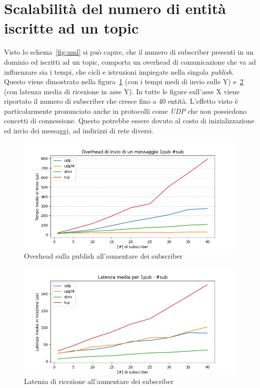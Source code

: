 \section{Scalabilità del numero di entità iscritte ad un topic}
Visto lo schema~\ref{fig:uml} si può capire, che il numero di subscriber presenti in un dominio ed iscritti ad un topic, comporta un overhead di comunicazione che va ad influenzare sia i tempi, che cicli e istruzioni impiegate nella singola \emph{publish}. Questo viene dimostrato nella figura~\ref{fig:test3_overhead} (con i tempi medi di invio sulle Y) e~\ref{fig:test3_latenza} (con latenza media di ricezione in asse Y). In tutte le figure sull'asse X viene riportato il numero di subscriber che cresce fino a 40 entità. L'effetto visto è particolarmente pronunciato anche in protocolli come \emph{UDP} che non possiedono concetti di connessione. Questo potrebbe essere dovuto al costo di inizializzazione ed invio dei messaggi, ad indirizzi di rete diversi.
\begin{figure}[H]
    \centering
    \includegraphics[width=\textwidth]{./results/test3_sending_multiplesub.png}
    \caption{Overhead sulla publish all'aumentare dei subscriber}\label{fig:test3_overhead}
\end{figure}
\begin{figure}[H]
    \centering
    \includegraphics[width=\textwidth]{./results/test3_sendingreceiving_multiplesub.png} 
    \caption{Latenza di ricezione all'aumentare dei subscriber}\label{fig:test3_latenza}
\end{figure}

